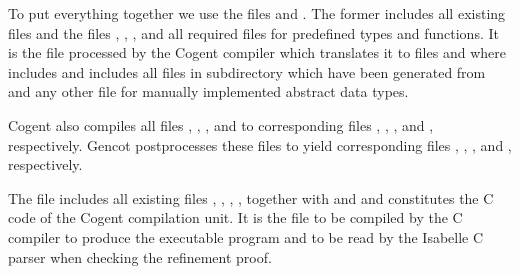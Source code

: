 To put everything together we use the files  and . The former includes all 
existing  files and the files , , 
, and all required files  for predefined types and functions.
It is the file processed by the Cogent compiler which translates it to files  
and  where  includes  and  includes all files
in subdirectory  which have been generated from  and any
other file  for manually implemented abstract data types. 

Cogent also compiles all files , , , and  to corresponding 
files , , , and , respectively. Gencot postprocesses these files to yield corresponding files 
, , , and , respectively.

The file  includes all existing files 
, , , , 
together with  and  and constitutes the C code of the Cogent compilation unit. 
It is the file to be compiled 
by the C compiler to produce the executable program and to be read by the Isabelle C parser when checking the refinement proof.

